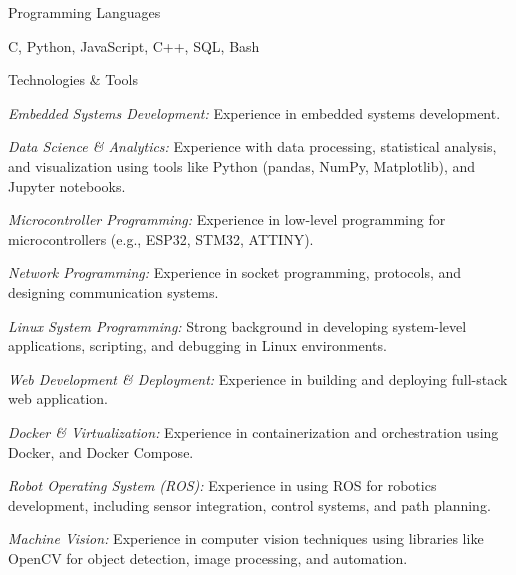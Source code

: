 

\begin{cventries}

  \cventry
    {Programming Languages} %
    {}
    {} %
    {} %
    {
      \begin{cvitems} %
        \item {C, Python, JavaScript, C++, SQL, Bash}
      \end{cvitems}
    }

  \cventry
    {Technologies \& Tools} %
    {} %
    {} %
    {} %
    {
	\begin{cvitems} %
		\item {\emph{Embedded Systems Development:} Experience in embedded systems development.}
		\item {\emph{Data Science \& Analytics:} Experience with data processing, statistical analysis, and visualization using tools like Python (pandas, NumPy, Matplotlib), and Jupyter notebooks.}
		\item {\emph{Microcontroller Programming:} Experience in low-level programming for microcontrollers (e.g., ESP32, STM32, ATTINY).}
		\item {\emph{Network Programming:} Experience in socket programming, protocols, and designing communication systems.}
		\item {\emph{Linux System Programming:} Strong background in developing system-level applications, scripting, and debugging in Linux environments.}
		\item {\emph{Web Development \& Deployment:} Experience in building and deploying full-stack web application.}
		\item {\emph{Docker \& Virtualization:} Experience in containerization and orchestration using Docker, and Docker Compose.}
		\item {\emph{Robot Operating System (ROS):} Experience in using ROS for robotics development, including sensor integration, control systems, and path planning.}
		\item {\emph{Machine Vision:} Experience in computer vision techniques using libraries like OpenCV for object detection, image processing, and automation.}
	\end{cvitems}
	}
\end{cventries}

